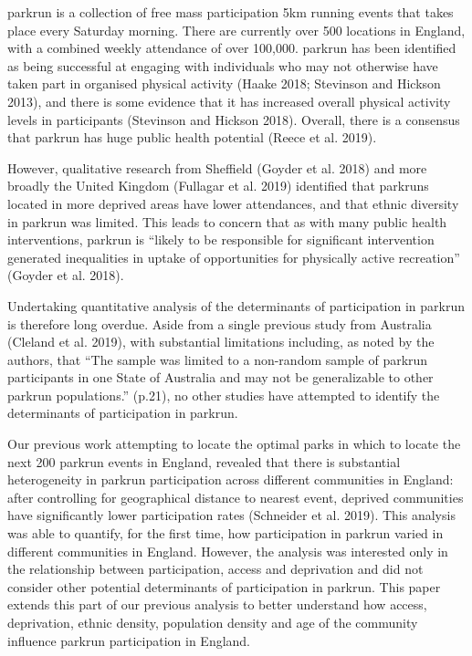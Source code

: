 \documentclass[]{article}
\begin{document}
parkrun is a collection of free mass participation 5km running events
that takes place every Saturday morning. There are currently over 500
locations in England, with a combined weekly attendance of over 100,000.
parkrun has been identified as being successful at engaging with
individuals who may not otherwise have taken part in organised physical
activity (Haake 2018; Stevinson and Hickson 2013), and there is some
evidence that it has increased overall physical activity levels in
participants (Stevinson and Hickson 2018). Overall, there is a consensus
that parkrun has huge public health potential (Reece et al. 2019).

However, qualitative research from Sheffield (Goyder et al. 2018) and
more broadly the United Kingdom (Fullagar et al. 2019) identified that
parkruns located in more deprived areas have lower attendances, and that
ethnic diversity in parkrun was limited. This leads to concern that as
with many public health interventions, parkrun is ``likely to be
responsible for significant intervention generated inequalities in
uptake of opportunities for physically active recreation'' (Goyder et
al. 2018).

Undertaking quantitative analysis of the determinants of participation
in parkrun is therefore long overdue. Aside from a single previous study
from Australia (Cleland et al. 2019), with substantial limitations
including, as noted by the authors, that ``The sample was limited to a
non-random sample of parkrun participants in one State of Australia and
may not be generalizable to other parkrun populations.'' (p.21), no
other studies have attempted to identify the determinants of
participation in parkrun.

Our previous work attempting to locate the optimal parks in which to
locate the next 200 parkrun events in England, revealed that there is
substantial heterogeneity in parkrun participation across different
communities in England: after controlling for geographical distance to
nearest event, deprived communities have significantly lower
participation rates (Schneider et al. 2019). This analysis was able to
quantify, for the first time, how participation in parkrun varied in
different communities in England. However, the analysis was interested
only in the relationship between participation, access and deprivation
and did not consider other potential determinants of participation in
parkrun. This paper extends this part of our previous analysis to better
understand how access, deprivation, ethnic density, population density
and age of the community influence parkrun participation in England.
\end{document}
